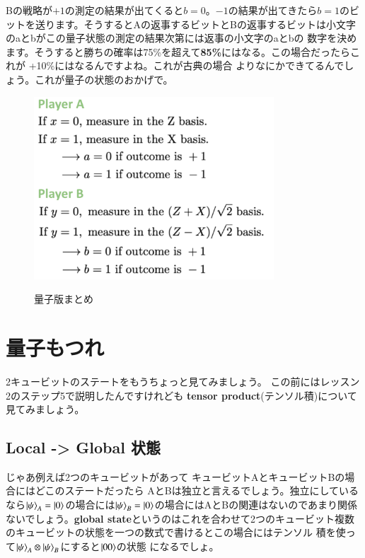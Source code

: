 Bの戦略が$+1$の測定の結果が出てくると$b=0$。$-1$の結果が出てきたら$b = 1$のビットを送ります。そうするとAの返事するビットとBの返事するビットは小文字のaとbがこの量子状態の測定の結果次第には返事の小文字のaとbの
数字を決めます。そうすると勝ちの確率は75\%を超えて\textbf{85\%}にはなる。この場合だったらこれが +10\%にはなるんですよね。これが古典の場合
よりなにかできてるんでしょう。これが量子の状態のおかげで。
\begin{figure}[H]
    \centering
    \includegraphics[width=0.8\textwidth]{lesson4/CHSH_quantum_guide.pdf}
    \label{fig: 1}
    \begin{center}
        \caption{量子版まとめ}
    \end{center}
\end{figure}


\section{量子もつれ}
2キュービットのステートをもうちょっと見てみましょう。
この前にはレッスン2のステップ5で説明したんですけれども
\textbf{tensor product}(テンソル積)について見てみましょう。
\subsection{Local -> Global 状態}
じゃあ例えば2つのキュービットがあって
キュービットAとキュービットBの場合にはどこのステートだったら
AとBは独立と言えるでしょう。独立にしているなら$\ket{\psi}_A = \ket{0}$の場合には$\ket{\psi}_B = \ket{0}$の場合にはAとBの関連はないのであまり関係ないでしょう。\textbf{global state}というのはこれを合わせて2つのキュービット複数のキュービットの状態を一つの数式で書けるとこの場合にはテンソル
積を使って$\ket{\psi}_A \otimes \ket{\psi}_B$にすると$\ket{00}$の状態
になるでしょ。

